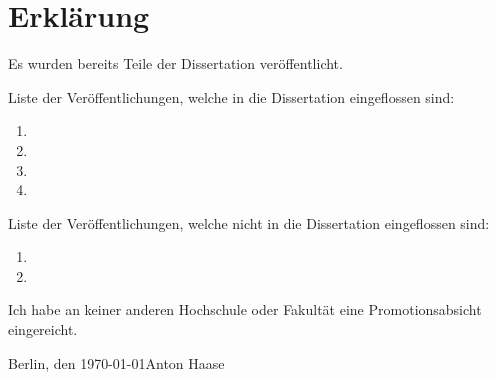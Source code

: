 \noindent
\pagestyle{empty}

\section*{Erklärung}

Es wurden bereits Teile der Dissertation veröffentlicht.
\vspace{2ex}

Liste der Veröffentlichungen, welche in die Dissertation eingeflossen sind:

\begin{enumerate}[label=\arabic*) ]
    \item {} 

    \item {} 

    \item {} 

    \item {} 

\end{enumerate}
Liste der Veröffentlichungen, welche nicht in die Dissertation eingeflossen sind:
\begin{enumerate}[label=\arabic*) ]
    \item {} 

    \item {} 
    
\end{enumerate}


Ich habe an keiner anderen Hochschule oder Fakultät eine Promotionsabsicht eingereicht.

\vspace{3cm}

\noindent Berlin, den \today \hfill Anton Haase

\cleardoublepage
